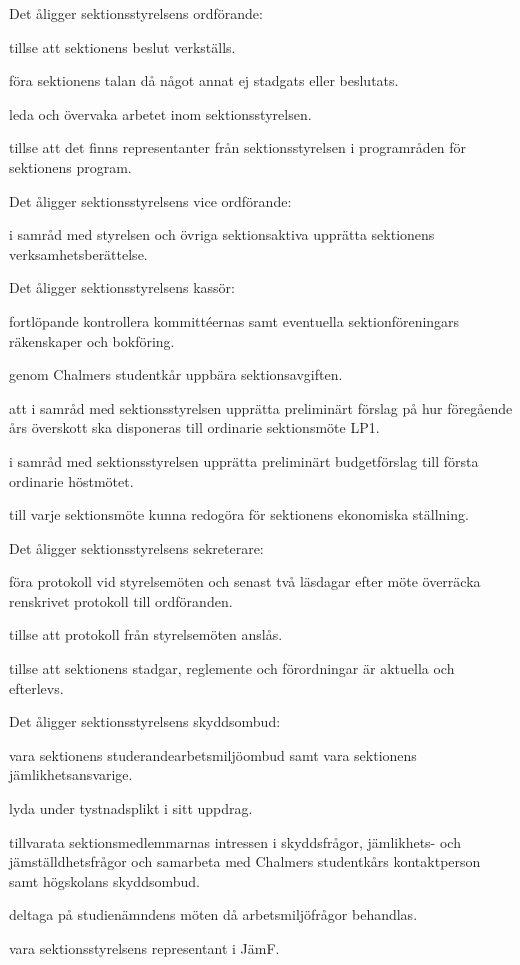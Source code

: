 \documentclass{styrdokument}
\begin{document}
\? Det åligger sektionsstyrelsens ordförande:
\begin{aligganden}
    \item tillse att sektionens beslut verkställs.
    \item föra sektionens talan då något annat ej stadgats eller beslutats.
    \item leda och övervaka arbetet inom sektionsstyrelsen.
    \item tillse att det finns representanter från sektionsstyrelsen i programråden för sektionens program.
\end{aligganden}

\? Det åligger sektionsstyrelsens vice ordförande:
\begin{aligganden}
    \item i samråd med styrelsen och övriga sektionsaktiva upprätta sektionens verksamhetsberättelse.
\end{aligganden}

\? Det åligger sektionsstyrelsens  kassör:
\begin{aligganden}
    \item fortlöpande kontrollera kommittéernas samt eventuella sektionföreningars räkenskaper och bokföring.
    \item genom Chalmers studentkår uppbära sektionsavgiften.
    \item att i samråd med sektionsstyrelsen upprätta preliminärt förslag på hur föregående års överskott ska
disponeras till ordinarie sektionsmöte LP1.
    \item i samråd med sektionsstyrelsen upprätta preliminärt budgetförslag till första ordinarie höstmötet.
    \item till varje sektionsmöte kunna redogöra för sektionens ekonomiska ställning.
\end{aligganden}

\? Det åligger sektionsstyrelsens sekreterare:
\begin{aligganden}
    \item föra protokoll vid styrelsemöten och senast två läsdagar efter möte överräcka renskrivet protokoll till ordföranden.
    \item tillse att protokoll från styrelsemöten anslås.
    \item tillse att sektionens stadgar, reglemente och förordningar är aktuella och efterlevs.
\end{aligganden}

\? Det åligger sektionsstyrelsens skyddsombud:
\begin{aligganden}
    \item vara sektionens studerandearbetsmiljöombud samt vara sektionens jämlikhetsansvarige.
    \item lyda under tystnadsplikt i sitt uppdrag.
    \item tillvarata sektionsmedlemmarnas intressen i skyddsfrågor, jämlikhets- och jämställdhetsfrågor och samarbeta med Chalmers studentkårs kontaktperson samt högskolans skyddsombud.
    \item deltaga på studienämndens möten då arbetsmiljöfrågor behandlas.
    \item vara sektionsstyrelsens representant i JämF.
\end{aligganden}
\end{document}
